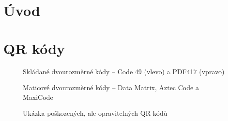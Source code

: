 
\chapter{Úvod}
\chapter{QR kódy}

\begin{figure}[H]
  \begin{center}
    \caption{Skládané dvourozměrné kódy -- Code 49 (vlevo) a PDF417 (vpravo)}
    \label{stackedCodes}
  \end{center}
\end{figure}

\begin{figure}[H]
  \begin{center}
    \caption{Maticové dvourozměrné kódy -- Data Matrix, Aztec Code a MaxiCode}
    \label{matrixCodes}
  \end{center}
\end{figure}

\begin{figure}[H]
  \begin{center}
    \caption{Ukázka poškozených, ale opravitelných QR kódů}
    \label{corruptedQRCodes}
  \end{center}
\end{figure}

